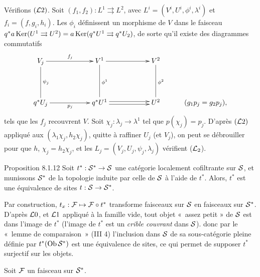 \documentclass[10pt]{../fichiers-configuration-latex/smfart}
\begin{document}
Vérifions $({\mathcal L}2)$. Soit $(f_1, f_2) : L^1 \rightrightarrows
L^2$, avec $L^i = (V^i, U^i, \phi^i, \lambda^i)$ et $f_i = (f, g_i,
h_i)$. Les $\phi_i$ définissent un morphisme de $V$ dans le faisceau
$q^{\ast} a \operatorname{Ker}(U^1 \rightrightarrows U^2) = a \operatorname{Ker}(q^{\ast} U^1 \rightrightarrows
q^{\ast} U_2)$, de sorte qu'il existe des diagrammes commutatifs
\[
\xymatrix@C=2cm@R=1.5cm{
V_j \ar[r]^{f_j} \ar@{-}[d]^{\psi_j}& V^1 \ar[r] \ar@{-}[d]^{\phi^{1}}
& V^2 \ar@{-}[d]^{\phi^{2}}\\
q^{\ast}U_j \ar[r]_{p_j} & q^{\ast}U^{1} \ar@<2pt>[r] \ar@<-2pt>[r]&  U^{2} &\kern-1cm  (\mathsf{g}_1p_j =  \mathsf{g}_2p_j),
}
\]
tels que les $f_j$ recouvrent $V$. Soit $\chi_j : \lambda_j \to
\lambda^1$ tel que $p(\chi_j) = p_j$. D'après $({\mathcal L}2)$ appliqué aux
$(\lambda_1 \chi_j, h_2 \chi_j)$, quitte à raffiner $U_j$ (et
$V_j$), on peut se débrouiller pour que $h$, $\chi_j = h_2 \chi_j$,
et les $L_j = (V_j, U_j, \psi_j, \lambda_j)$ vérifient (${\mathcal L}_2$).

\begin{enonce*}{Proposition 8.1.12}
Soit $t^{\ast} : \Ss^{\ast} \to \Ss$ une catégorie localement cofiltrante sur ${\mathcal S}$,
et munissons ${\mathcal S}^{\ast}$ de la topologie induite par celle de ${\mathcal S}$ à l'aide
de $t^{\ast}$. Alors, $t^{\ast}$ est une équivalence de sites $t : \Ss \to \Ss^{\ast}$.
\end{enonce*}

Par construction, $t_x : {\mathcal F} \mapsto {\mathcal F} \circ t^{\ast}$ transforme
faisceaux sur ${\mathcal S}$ en faisceaux sur ${\mathcal S}^{\ast}$. D'après ${\mathcal L}0$,
et ${\mathcal L}1$ appliqué à la famille vide, tout objet « assez petit »
de ${\mathcal S}$ est dans l'image de $t^{\ast}$ (\ie l'image de $t^{\ast}$
est un \emph{crible couvrant} dans ${\mathcal S}$). donc par le « lemme de
comparaison » (III 4) l'inclusion dans ${\mathcal S}$ de sa sous-catégorie %
pleine définie par $t^{\ast}(\operatorname{Ob} {\mathcal S}^{\ast})$ est une équivalence de
sites, ce qui permet de supposer $t^{\ast}$ surjectif sur les
objets.

Soit ${\mathcal F}$ un faisceau sur ${\mathcal S}^{\ast}$.
\end{document}
